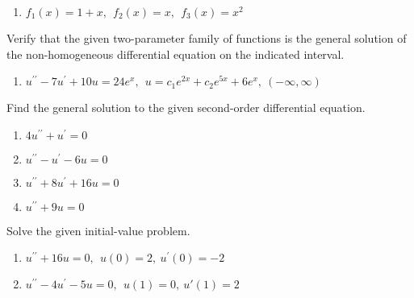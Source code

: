 \begin{fullwidth}
\begin{enumerate}[resume=outerlist]
\vspace{1.0cm}

\item $f_1(x)=1+x, \ \ f_2(x)=x, \ \ f_3(x)=x^2$
\vspace{1.0cm}
\end{enumerate}


Verify that the given two-parameter family of functions is the general solution of the non-homogeneous differential equation on the indicated interval.

\begin{enumerate}[resume]
\item $u^{\prime \prime}-7u^{\prime}+10u=24e^{x}, \ \ u=c_1e^{2x}+c_2e^{5x}+6e^{x}, \ \left(-\infty,\infty\right)$

\vspace{1.0cm} 

\end{enumerate}

Find the general solution to the given second-order differential equation.

\begin{enumerate}[resume]
\item $4u^{\prime \prime}+u^{\prime} = 0$

\vspace{1.0cm}

\item $u^{\prime \prime}-u^{\prime}-6u=0$

\vspace{1.0cm}

\item $u^{\prime \prime}+8u^{\prime}+16u=0$

\vspace{1.0cm}

\item $u^{\prime \prime}+9u=0$

\vspace{1.0cm}
\end{enumerate}


Solve the given initial-value problem.

\begin{enumerate}[resume]
\item $u^{\prime \prime}+16u=0, \ \ u(0)=2, \ u^{\prime}(0)=-2$

\vspace{1.0cm}

\item $u^{\prime \prime}-4u^{\prime}-5u=0, \ \ u(1)=0, \ u{\prime}(1)=2$


\end{enumerate}
\end{fullwidth}
